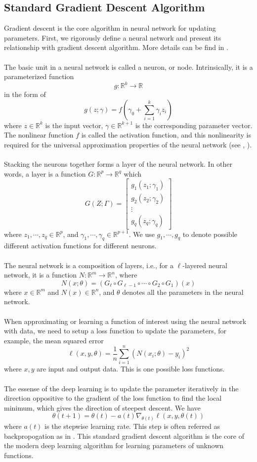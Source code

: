 \documentclass[a4paper]{article}
\begin{document}
\subsection{Standard Gradient Descent Algorithm}
Gradient descent is the core algorithm in neural network for updating parameters. First, we rigorously define a neural network and present its relationship with gradient descent algorithm. More details can be find in \cite{goodfellow2016deep}.\\
\\
The basic unit in a neural network is called a neuron, or node. Intrinsically, it is a parameterized function
$$
g: \mathbb{R}^k \to \mathbb{R}
$$
in the form of
$$
g(z;\gamma) = f\left(\gamma_0 + \sum_{i=1}^k \gamma_i z_i\right)
$$
where $z\in\mathbb{R}^k$ is the input vector, $\gamma\in\mathbb{R}^{k+1}$ is the corresponding parameter vector. The nonlinear function $f$ is called the activation function, and this nonlinearity is required for the universal approximation properties of the neural network (see \cite{cybenko1989approximation}, \cite{hornik1989multilayer}).\\
\\
Stacking the neurons together forms a layer of the neural network. In other words, a layer is a function $G: \mathbb{R}^p\to \mathbb{R}^q$ which
$$
G(Z;\Gamma) = \begin{bmatrix}
    g_1(z_1;\gamma_1)\\
    g_2(z_2;\gamma_2)\\
    \vdots\\
    g_q(z_q; \gamma_q)
\end{bmatrix}
$$
where $z_1,\cdots ,z_q\in \mathbb{R}^p$, and $\gamma_1,\cdots,\gamma_q\in \mathbb{R}^{p+1}$. We use $g_1,\cdots,g_q$ to denote possible different activation functions for different neurons.\\
\\
The neural network is a composition of layers, i.e., for a $\ell$-layered neural network, it is a function $N: \mathbb{R}^m\to \mathbb{R}^n$, where
$$
N(x;\theta) = (G_\ell \circ G_{\ell-1} \circ \cdots \circ G_2\circ G_1)(x)
$$
where $x\in \mathbb{R}^m$ and $N(x)\in \mathbb{R}^n$, and $\theta$ denotes all the parameters in the neural network.\\
\\
When approximating or learning a function of interest using the neural network with data, we need to setup a loss function to update the parameters, for example, the mean squared error 
$$
\ell (x,y,\theta) = \frac{1}{n}\sum_{i=1}^n (N(x_i;\theta)-y_i)^2
$$
where $x,y$ are input and output data. This is one possible loss functions.\\
\\
The essense of the deep learning is to update the parameter iteratively in the direction oppositive to the gradient of the loss function to find the local minimum, which gives the direction of steepest descent. We have
$$
\theta(t+1) = \theta(t) - a(t) \nabla_{\theta(t)} \ell (x,y,\theta(t))
$$
where $a(t)$ is the stepwise learning rate. This step is often referred as backpropogation as in \cite{rumelhart1986learning}. This standard gradient descent algorithm is the core of the modern deep learning algorithm for learning parameters of unknown functions.
\end{document}
